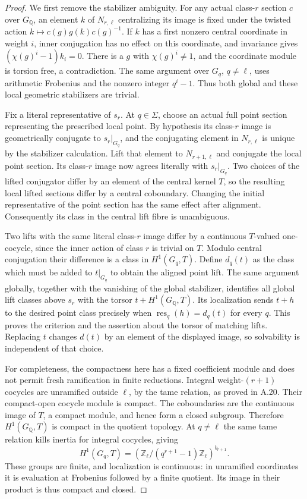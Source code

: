 \begin{proof}
We first remove the stabilizer ambiguity. For any actual class-$r$
section $c$ over $G_{\mathbb Q}$, an element $k$ of $N_{r,\ell}$
centralizing its image is fixed under the twisted action
$k\mapsto c(g)g(k)c(g)^{-1}$. If $k$ has a first nonzero central
coordinate in weight $i$, inner conjugation has no effect on this
coordinate, and invariance gives
$(\chi(g)^i-1)k_i=0$. There is a $g$ with $\chi(g)^i\ne1$,
and the coordinate module is torsion free, a contradiction. The same
argument over $G_q$, $q\ne\ell$, uses arithmetic Frobenius and
the nonzero integer $q^i-1$. Thus both global and these local
geometric stabilizers are trivial.

Fix a literal representative of $s_r$. At $q\in\Sigma$, choose
an actual full point section representing the prescribed local point.
By hypothesis its class-$r$ image is geometrically conjugate to
$s_r|_{G_q}$, and the conjugating element in $N_{r,\ell}$ is
unique by the stabilizer calculation. Lift that element to
$N_{r+1,\ell}$ and conjugate the local point section. Its
class-$r$ image now agrees literally with $s_r|_{G_q}$.
Two choices of the lifted conjugator differ by an element of the
central kernel $T$, so the resulting local lifted sections differ
by a central coboundary. Changing the initial representative of the
point section has the same effect after alignment. Consequently its
class in the central lift fibre is unambiguous.

Two lifts with the same literal class-$r$ image differ by a
continuous $T$-valued one-cocycle, since the inner action of class
$r$ is trivial on $T$. Modulo central conjugation their difference
is a class in $H^1(G_q,T)$. Define $d_q(t)$ as the class which
must be added to $t|_{G_q}$ to obtain the aligned point lift.
The same argument globally, together with the vanishing of the
global stabilizer, identifies all global lift classes above $s_r$
with the torsor $t+H^1(G_{\mathbb Q},T)$. Its localization sends
$t+h$ to the desired point class precisely when
$\operatorname{res}_q(h)=d_q(t)$ for every $q$. This proves the
criterion and the assertion about the torsor of matching lifts.
Replacing $t$ changes $d(t)$ by an element of the displayed image,
so solvability is independent of that choice.

For completeness, the compactness here has a fixed coefficient
module and does not permit fresh ramification in finite reductions.
Integral weight-$(r+1)$ cocycles are unramified outside $\ell$,
by the tame relation, as proved in A.20. Their compact-open cocycle
module is compact. The coboundaries are the continuous image of
$T$, a compact module, and hence form a closed subgroup. Therefore
$H^1(G_{\mathbb Q},T)$ is compact in the quotient topology.
At $q\ne\ell$ the same tame relation kills inertia for integral
cocycles, giving
\[
 H^1(G_q,T)=
 \left(\mathbb Z_\ell/(q^{r+1}-1)\mathbb Z_\ell\right)^{b_{r+1}}.
\]
These groups are finite, and localization is continuous: in unramified
coordinates it is evaluation at Frobenius followed by a finite
quotient. Its image in their product is thus compact and closed.


\end{proof}
